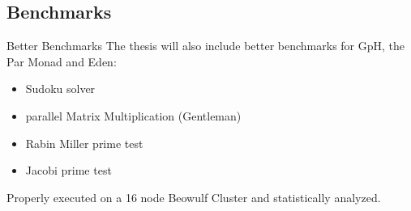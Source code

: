 \subsection{Benchmarks}

\begin{frame}[fragile]{Better Benchmarks}
The thesis will also include better benchmarks for GpH, the Par Monad and Eden:
\\
\begin{itemize}
\item Sudoku solver
\item parallel Matrix Multiplication (Gentleman)
\item Rabin Miller prime test
\item Jacobi prime test
\end{itemize}
Properly executed on a 16 node Beowulf Cluster and statistically
analyzed.
\end{frame}